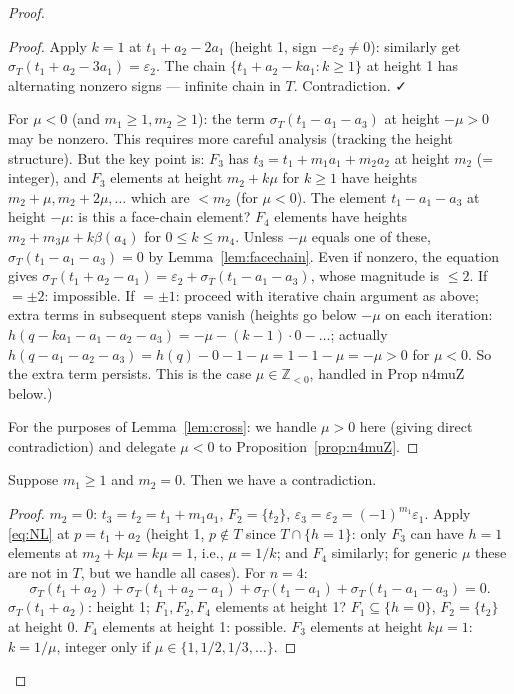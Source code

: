\begin{proof}
\begin{proof}
Apply $k=1$ at $t_1+a_2-2a_1$ (height 1, sign $-\varepsilon_2 \neq 0$): similarly get $\sigma_T(t_1+a_2-3a_1)=\varepsilon_2$. The chain $\{t_1+a_2-ka_1 : k \geq 1\}$ at height 1 has alternating nonzero signs — infinite chain in $T$. Contradiction. ✓

For $\mu < 0$ (and $m_1 \geq 1, m_2 \geq 1$): the term $\sigma_T(t_1-a_1-a_3)$ at height $-\mu > 0$ may be nonzero. This requires more careful analysis (tracking the height structure). But the key point is: $F_3$ has $t_3 = t_1+m_1a_1+m_2a_2$ at height $m_2$ (= integer), and $F_3$ elements at height $m_2 + k\mu$ for $k \geq 1$ have heights $m_2+\mu, m_2+2\mu,\ldots$ which are $< m_2$ (for $\mu<0$). The element $t_1-a_1-a_3$ at height $-\mu$: is this a face-chain element? $F_4$ elements have heights $m_2+m_3\mu + k\beta(a_4)$ for $0 \leq k \leq m_4$. Unless $-\mu$ equals one of these, $\sigma_T(t_1-a_1-a_3)=0$ by Lemma~\ref{lem:facechain}. Even if nonzero, the equation gives $\sigma_T(t_1+a_2-a_1) = \varepsilon_2 + \sigma_T(t_1-a_1-a_3)$, whose magnitude is $\leq 2$. If $=\pm 2$: impossible. If $=\pm 1$: proceed with iterative chain argument as above; extra terms in subsequent steps vanish (heights go below $-\mu$ on each iteration: $h(q-k a_1 - a_1 - a_2 - a_3) = -\mu - (k-1)\cdot 0 - \ldots$; actually $h(q-a_1-a_2-a_3) = h(q) - 0 - 1 - \mu = 1 - 1 - \mu = -\mu > 0$ for $\mu < 0$. So the extra term persists. This is the case $\mu \in \mathbb{Z}_{<0}$, handled in Prop n4muZ below.)

For the purposes of Lemma~\ref{lem:cross}: we handle $\mu > 0$ here (giving direct contradiction) and delegate $\mu < 0$ to Proposition~\ref{prop:n4muZ}.
\end{proof}

\bigskip

\begin{lemma}[cross1: $m_1 \geq 1$, $m_2 = 0$]\label{lem:cross1}
Suppose $m_1 \geq 1$ and $m_2 = 0$. Then we have a contradiction.
\end{lemma}
\begin{proof}
$m_2=0$: $t_3 = t_2 = t_1+m_1a_1$, $F_2 = \{t_2\}$, $\varepsilon_3 = \varepsilon_2 = (-1)^{m_1}\varepsilon_1$. Apply \eqref{eq:NL} at $p = t_1+a_2$ (height 1, $p \notin T$ since $T \cap \{h=1\}$: only $F_3$ can have $h=1$ elements at $m_2+k\mu = k\mu = 1$, i.e., $\mu=1/k$; and $F_4$ similarly; for generic $\mu$ these are not in $T$, but we handle all cases). For $n=4$:
\[
  \sigma_T(t_1+a_2)+\sigma_T(t_1+a_2-a_1)+\sigma_T(t_1-a_1)+\sigma_T(t_1-a_1-a_3)=0.
\]
$\sigma_T(t_1+a_2)$: height 1; $F_1,F_2,F_4$ elements at height 1? $F_1 \subseteq \{h=0\}$, $F_2=\{t_2\}$ at height 0. $F_4$ elements at height 1: possible. $F_3$ elements at height $k\mu=1$: $k=1/\mu$, integer only if $\mu \in \{1,1/2,1/3,\ldots\}$.


\end{proof}
\end{proof}
